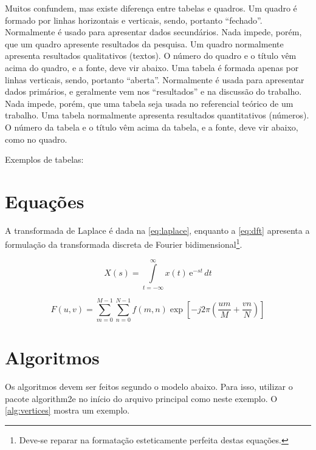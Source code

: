 

Muitos confundem, mas existe diferença entre tabelas e quadros.
Um quadro é formado por linhas horizontais e verticais,
sendo, portanto ``fechado''. Normalmente é usado
para apresentar dados secundários. Nada impede, porém,
que um quadro apresente resultados da pesquisa.
Um quadro normalmente apresenta resultados
qualitativos (textos). O número do quadro e o título
vêm acima do quadro, e a fonte, deve vir abaixo.
Uma tabela é formada apenas por linhas verticais, sendo,
portanto ``aberta''. Normalmente é usada para
apresentar dados primários, e geralmente vem nos
``resultados'' e na discussão do trabalho. Nada
impede, porém, que uma tabela seja usada no
referencial teórico de um trabalho. Uma tabela
normalmente apresenta resultados quantitativos
(números). O número da tabela e o título vêm
acima da tabela, e a fonte, deve vir abaixo, como
no quadro.

Exemplos de tabelas:





\section{Equações}
\label{sec:equacoes}

A transformada de Laplace é dada na \autoref{eq:laplace}, enquanto a \autoref{eq:dft} apresenta a formulação da transformada discreta de Fourier bidimensional\footnote{Deve-se reparar na formatação esteticamente perfeita destas equações.}.

\begin{equation}
    X(s) = \int\limits_{t = -\infty}^{\infty} x(t) \, \text{e}^{-st} \, dt
    \label{eq:laplace}
\end{equation}

\begin{equation}
    F(u, v) = \sum_{m = 0}^{M - 1} \sum_{n = 0}^{N - 1} f(m, n) \exp \left[ -j 2 \pi \left( \frac{u m}{M} + \frac{v n}{N} \right) \right]
    \label{eq:dft}
\end{equation}

\section{Algoritmos}\label{sec:algoritmos}

Os algoritmos devem ser feitos segundo o modelo abaixo.
Para isso, utilizar o pacote {\ttfamily algorithm2e} no início do arquivo principal como neste exemplo.
O \autoref{alg:vertices} mostra um exemplo.


